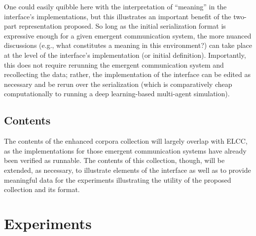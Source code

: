 One could easily quibble here with the interpretation of ``meaning'' in the interface's implementations, but this illustrates an important benefit of the two-part representation proposed.
So long as the initial serialization format is expressive enough for a given emergent communication system, the more nuanced discussions (e.g., what constitutes a meaning in this environment?) can take place at the level of the interface's implementation (or initial definition).
Importantly, this does not require rerunning the emergent communication system and recollecting the data; rather, the implementation of the interface can be edited as necessary and be rerun over the serialization (which is comparatively cheap computationally to running a deep learning-based multi-agent simulation).


\subsection{Contents}
The contents of the enhanced corpora collection will largely overlap with ELCC, as the implementations for those emergent communication systems have already been verified as runnable.
The contents of this collection, though, will be extended, as necessary, to illustrate elements of the interface as well as to provide meaningful data for the experiments illustrating the utility of the proposed collection and its format.


\section{Experiments}

